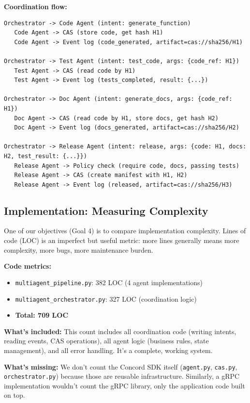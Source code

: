 \documentclass[11pt]{article}
\begin{document}
\textbf{Coordination flow:}
\begin{lstlisting}
Orchestrator -> Code Agent (intent: generate_function)
   Code Agent -> CAS (store code, get hash H1)
   Code Agent -> Event log (code_generated, artifact=cas://sha256/H1)

Orchestrator -> Test Agent (intent: test_code, args: {code_ref: H1})
   Test Agent -> CAS (read code by H1)
   Test Agent -> Event log (tests_completed, result: {...})

Orchestrator -> Doc Agent (intent: generate_docs, args: {code_ref: H1})
   Doc Agent -> CAS (read code by H1, store docs, get hash H2)
   Doc Agent -> Event log (docs_generated, artifact=cas://sha256/H2)

Orchestrator -> Release Agent (intent: release, args: {code: H1, docs: H2, test_result: {...}})
   Release Agent -> Policy check (require code, docs, passing tests)
   Release Agent -> CAS (create manifest with H1, H2)
   Release Agent -> Event log (released, artifact=cas://sha256/H3)
\end{lstlisting}

\subsection{Implementation: Measuring Complexity}

One of our objectives (Goal 4) is to compare implementation complexity. Lines of code (LOC) is an imperfect but useful metric: more lines generally means more complexity, more bugs, more maintenance burden.

\textbf{Code metrics:}
\begin{itemize}
\item \texttt{multiagent\_pipeline.py}: 382 LOC (4 agent implementations)
\item \texttt{multiagent\_orchestrator.py}: 327 LOC (coordination logic)
\item \textbf{Total: 709 LOC}
\end{itemize}

\textbf{What's included:} This count includes all coordination code (writing intents, reading events, CAS operations), all agent logic (business rules, state management), and all error handling. It's a complete, working system.

\textbf{What's missing:} We don't count the Concord SDK itself (\texttt{agent.py}, \texttt{cas.py}, \texttt{orchestrator.py}) because those are reusable infrastructure. Similarly, a gRPC implementation wouldn't count the gRPC library, only the application code built on top.
\end{document}
